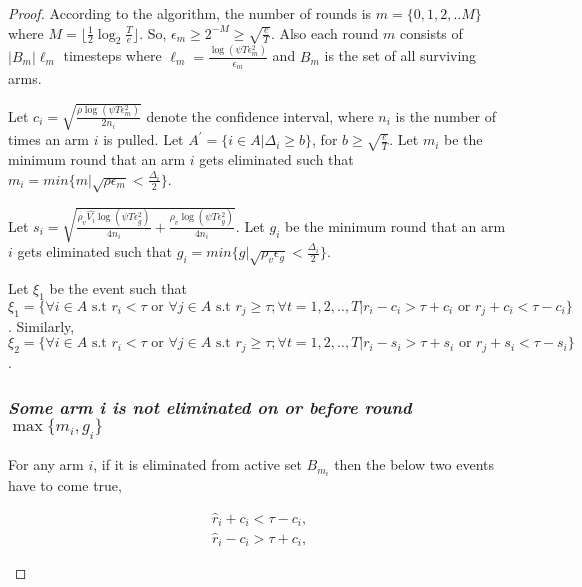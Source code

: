 \begin{proof}

According to the algorithm, the number of rounds is $m=\lbrace 0,1,2,.. M\rbrace $ where $M=\bigg\lfloor \frac{1}{2}\log_{2} \frac{T}{e}\bigg\rfloor$. So, $\epsilon_{m}\geq 2^{-M}\geq \sqrt{\frac{e}{T}}$. Also each round $m$ consists of $|B_{m}|\ell_{m}$ timesteps where $\ell_{m} = \frac{\log(\psi T \epsilon_{m}^{2})}{\epsilon_{m}}$ and $B_{m}$ is the set of all surviving arms. 

Let $c_{i} = \sqrt{\frac{\rho\log{(\psi T\epsilon_{m}^{2})}}{2 n_{i}}}$ denote the confidence interval, where $n_{i}$ is the number of times an arm $i$ is pulled. Let $A^{'}=\lbrace i\in A|\Delta_{i}\geq b\rbrace$, for $b\geq \sqrt{\frac{e}{T}}$. Let $m_{i}$ be the minimum round that an arm $i$ gets eliminated such that $m_{i}=min\lbrace m| \sqrt{\rho\epsilon_{m}}<\frac{\Delta_{i}}{2}\rbrace$. 


Let $s_{i}=\sqrt{\frac{\rho_v \hat{V_{i}} \log{(\psi T\epsilon_{g}^{2})}}{4 n_{i}} + \frac{\rho_v \log{(\psi T\epsilon_{g}^{2})}}{4 n_{i}}}$. Let $g_{i}$ be the minimum round that an arm $i$ gets eliminated such that $g_{i}=min\lbrace g| \sqrt{\rho_{v}\epsilon_{g}}<\frac{\Delta_{i}}{2}\rbrace$. 


Let $\xi_{1}$ be the event such that $\xi_{1}=\lbrace \forall i\in A \text{ s.t } r_i < \tau \text{ or }\forall j\in A 
\text{ s.t } r_j \geq \tau; \forall t=1,2,..,T | r_i - c_i  > \tau + c_i \text{ or } r_j + c_i < \tau - c_i  \rbrace$. Similarly, $\xi_{2}=\lbrace \forall i\in A \text{ s.t } r_i < \tau \text{ or }\forall j\in A \text{ s.t } r_j \geq \tau; \forall t=1,2,..,T | r_i - s_i  > \tau + s_i \text{ or } r_j + s_i < \tau - s_i  \rbrace$. 

\subsubsection{\textit{Some arm i is not eliminated on or before round $\max\lbrace m_{i},g_{i}\rbrace$}}
For any arm $i$, if it is eliminated from active set $B_{m_{i}}$ then the below two events have to come true,
\begin{small}
\begin{align}
\hat{r}_{i} + c_{i} < \tau - c_{i}, \label{eq:armelim-casea}\\
\hat{r}_{i} - c_{i} > \tau + c_{i}, \label{eq:armelim-caseb}
\end{align}
\end{small}



\end{proof}
